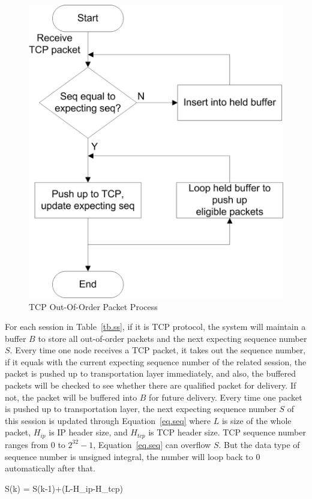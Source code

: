 \begin{figure}
\centering
\includegraphics[width=0.8\linewidth]{fig/outoforder.eps}
\caption{TCP Out-Of-Order Packet Process}
\label{fig.outoforder}
\end{figure}


For each session in Table~\ref{tb.ss}, if it is TCP protocol, the system will maintain a buffer $B$ to store all out-of-order packets and the next expecting sequence number $S$. Every time one node receives a TCP packet, it takes out the sequence number, if it equals with the current expecting sequence number of the related session, the packet is pushed up to transportation layer immediately, and also, the buffered packets will be checked to see whether there are qualified packet for delivery. If not, the packet will be buffered into $B$ for future delivery. Every time one packet is pushed up to transportation layer, the next expecting sequence number $S$ of this session is updated through Equation~\ref{eq.seq} where $L$ is size of the whole packet, $H_{ip}$ is IP header size, and $H_{tcp}$ is TCP header size. TCP sequence number ranges from $0$ to $2^{32}-1$, Equation~\ref{eq.seq} can overflow $S$. But the data type of sequence number is unsigned integral, the number will loop back to $0$ automatically after that. 

\be
\label{eq.seq}
S(k) = S(k-1)+(L-H_{ip}-H_{tcp})
\ee

